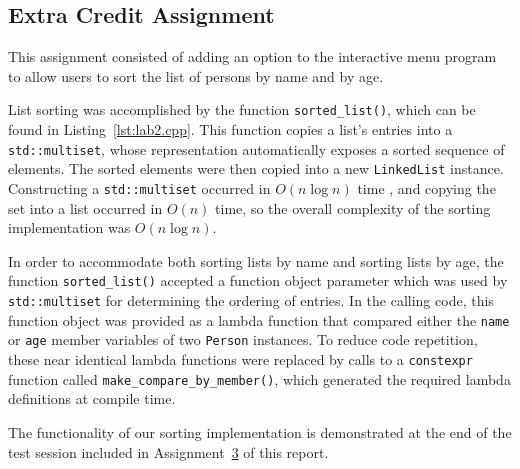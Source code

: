 \documentclass[11pt, letterpaper]{article} %
\begin{document}
\subsection*{Extra Credit Assignment}

This assignment consisted of adding an option to the interactive menu program to allow users to sort the list of persons by name and by age.

List sorting was accomplished by the function \texttt{sorted\_list()}, which can be found in Listing~\ref{lst:lab2.cpp}. This function copies a list's entries into a \texttt{std::multiset}, whose representation automatically exposes a sorted sequence of elements. The sorted elements were then copied into a new \texttt{LinkedList} instance. Constructing a \texttt{std::multiset} occurred in $O(n\log n)$ time \cite[Table 90]{open-std-N4659}, and copying the set into a list occurred in $O(n)$ time, so the overall complexity of the sorting implementation was $O(n\log n)$.

In order to accommodate both sorting lists by name and sorting lists by age, the function \texttt{sorted\_list()} accepted a function object parameter which was used by \texttt{std::multiset} for determining the ordering of entries. In the calling code, this function object was provided as a lambda function that compared either the \texttt{name} or \texttt{age} member variables of two \texttt{Person} instances. To reduce code repetition, these near identical lambda functions were replaced by calls to a \texttt{constexpr} function called \texttt{make\_compare\_by\_member()}, which generated the required lambda definitions at compile time.

The functionality of our sorting implementation is demonstrated at the end of the test session included in Assignment~\hyperref[sec:assign-3]{3} of this report.

\end{document}
